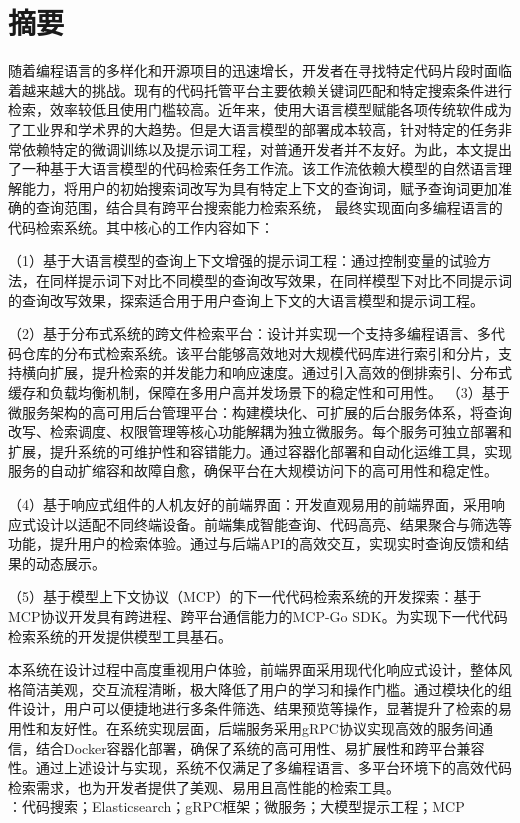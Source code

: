 \documentclass[UTF8,a4paper,12pt]{ctexart}
\numberwithin{equation}{section}
\begin{document}
\section*{摘\quad 要}
随着编程语言的多样化和开源项目的迅速增长，开发者在寻找特定代码片段时面临着越来越大的挑战。现有的代码托管平台主要依赖关键词匹配和特定搜索条件进行检索，效率较低且使用门槛较高。近年来，使用大语言模型赋能各项传统软件成为了工业界和学术界的大趋势。但是大语言模型的部署成本较高，针对特定的任务非常依赖特定的微调训练以及提示词工程，对普通开发者并不友好。为此，本文提出了一种基于大语言模型的代码检索任务工作流。该工作流依赖大模型的自然语言理解能力，将用户的初始搜索词改写为具有特定上下文的查询词，赋予查询词更加准确的查询范围，结合具有跨平台搜索能力检索系统， 最终实现面向多编程语言的代码检索系统。其中核心的工作内容如下：\par
（1）基于大语言模型的查询上下文增强的提示词工程：通过控制变量的试验方法，在同样提示词下对比不同模型的查询改写效果，在同样模型下对比不同提示词的查询改写效果，探索适合用于用户查询上下文的大语言模型和提示词工程。\par
（2）基于分布式系统的跨文件检索平台：设计并实现一个支持多编程语言、多代码仓库的分布式检索系统。该平台能够高效地对大规模代码库进行索引和分片，支持横向扩展，提升检索的并发能力和响应速度。通过引入高效的倒排索引、分布式缓存和负载均衡机制，保障在多用户高并发场景下的稳定性和可用性。
（3）基于微服务架构的高可用后台管理平台：构建模块化、可扩展的后台服务体系，将查询改写、检索调度、权限管理等核心功能解耦为独立微服务。每个服务可独立部署和扩展，提升系统的可维护性和容错能力。通过容器化部署和自动化运维工具，实现服务的自动扩缩容和故障自愈，确保平台在大规模访问下的高可用性和稳定性。\par
（4）基于响应式组件的人机友好的前端界面：开发直观易用的前端界面，采用响应式设计以适配不同终端设备。前端集成智能查询、代码高亮、结果聚合与筛选等功能，提升用户的检索体验。通过与后端API的高效交互，实现实时查询反馈和结果的动态展示。\par
（5）基于模型上下文协议（MCP）的下一代代码检索系统的开发探索：基于MCP协议开发具有跨进程、跨平台通信能力的MCP-Go SDK。为实现下一代代码检索系统的开发提供模型工具基石。\par
本系统在设计过程中高度重视用户体验，前端界面采用现代化响应式设计，整体风格简洁美观，交互流程清晰，极大降低了用户的学习和操作门槛。通过模块化的组件设计，用户可以便捷地进行多条件筛选、结果预览等操作，显著提升了检索的易用性和友好性。在系统实现层面，后端服务采用gRPC协议实现高效的服务间通信，结合Docker容器化部署，确保了系统的高可用性、易扩展性和跨平台兼容性。通过上述设计与实现，系统不仅满足了多编程语言、多平台环境下的高效代码检索需求，也为开发者提供了美观、易用且高性能的检索工具。
~\\
：代码搜索；Elasticsearch；gRPC框架；微服务；大模型提示工程；MCP\\
\end{document}
